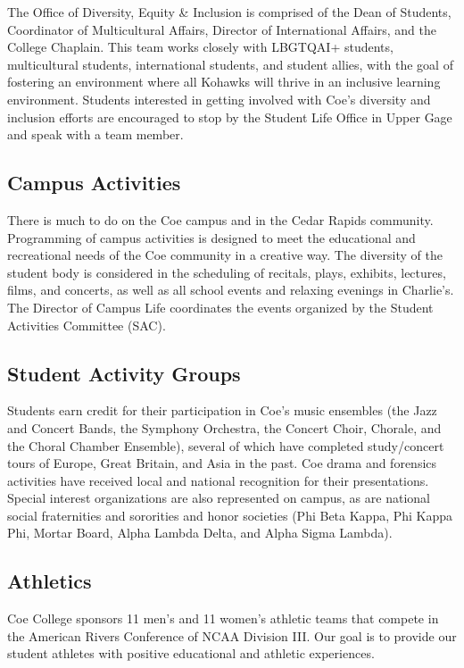 \documentclass[
  letterpaper,
]{scrbook}
\begin{document}
The Office of Diversity, Equity \& Inclusion is comprised of the Dean of
Students, Coordinator of Multicultural Affairs, Director of
International Affairs, and the College Chaplain. This team works closely
with LBGTQAI+ students, multicultural students, international students,
and student allies, with the goal of fostering an environment where all
Kohawks will thrive in an inclusive learning environment. Students
interested in getting involved with Coe's diversity and inclusion
efforts are encouraged to stop by the Student Life Office in Upper Gage
and speak with a team member.

\subsection{Campus Activities}\label{campus-activities}

There is much to do on the Coe campus and in the Cedar Rapids community.
Programming of campus activities is designed to meet the educational and
recreational needs of the Coe community in a creative way. The diversity
of the student body is considered in the scheduling of recitals, plays,
exhibits, lectures, films, and concerts, as well as all school events
and relaxing evenings in Charlie's. The Director of Campus Life
coordinates the events organized by the Student Activities Committee
(SAC).

\subsection{Student Activity Groups}\label{student-activity-groups}

Students earn credit for their participation in Coe's music ensembles
(the Jazz and Concert Bands, the Symphony Orchestra, the Concert Choir,
Chorale, and the Choral Chamber Ensemble), several of which have
completed study/concert tours of Europe, Great Britain, and Asia in the
past. Coe drama and forensics activities have received local and
national recognition for their presentations. Special interest
organizations are also represented on campus, as are national social
fraternities and sororities and honor societies (Phi Beta Kappa, Phi
Kappa Phi, Mortar Board, Alpha Lambda Delta, and Alpha Sigma Lambda).

\subsection{Athletics}\label{athletics}

Coe College sponsors 11 men's and 11 women's athletic teams that compete
in the American Rivers Conference of NCAA Division III. Our goal is to
provide our student athletes with positive educational and athletic
experiences.
\end{document}
